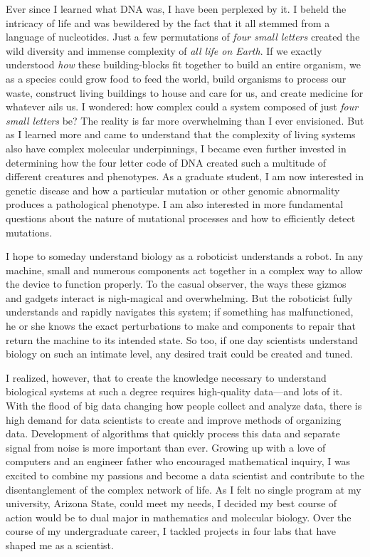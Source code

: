 \documentclass[12pt]{article}
\begin{document}

Ever since I learned what DNA was, I have been perplexed by it. I beheld the intricacy of life and was bewildered by the fact that it all stemmed from a language of nucleotides. Just a few permutations of \textit{four small letters} created the wild diversity and immense complexity of \textit{all life on Earth}. If we exactly understood \textit{how} these building-blocks fit together to build an entire organism, we as a species could grow food to feed the world, build organisms to process our waste, construct living buildings to house and care for us, and create medicine for whatever ails us. I wondered: how complex could a system composed of just \textit{four small letters} be?
The reality is far more overwhelming than I ever envisioned.
But as I learned more and came to understand that the complexity of living systems also have complex molecular underpinnings, I became even further invested in determining how the four letter code of DNA created such a multitude of different creatures and phenotypes.
As a graduate student, I am now interested in genetic disease and how a particular mutation or other genomic abnormality produces a pathological phenotype. I am also interested in more fundamental questions about the nature of mutational processes and how to efficiently detect mutations.

I hope to someday understand biology as a roboticist understands a robot. In any machine, small and numerous components act together in a complex way to allow the device to function properly. To the casual observer, the ways these gizmos and gadgets interact is nigh-magical and overwhelming. But the roboticist fully understands and rapidly navigates this system; if something has malfunctioned, he or she knows the exact perturbations to make and components to repair that return the machine to its intended state. So too, if one day scientists understand biology on such an intimate level, any desired trait could be created and tuned.

I realized, however, that to create the knowledge necessary to understand biological systems at such a degree requires high-quality data---and lots of it. With the flood of big data changing how people collect and analyze data, there is high demand for data scientists to create and improve methods of organizing data. Development of algorithms that quickly process this data and separate signal from noise is more important than ever. Growing up with a love of computers and an engineer father who encouraged mathematical inquiry, I was excited to combine my passions and become a data scientist and contribute to the disentanglement of the complex network of life. As I felt no single program at my university, Arizona State, could meet my needs, I decided my best course of action would be to dual major in mathematics and molecular biology. Over the course of my undergraduate career, I tackled projects in four labs that have shaped me as a scientist.
\end{document}
